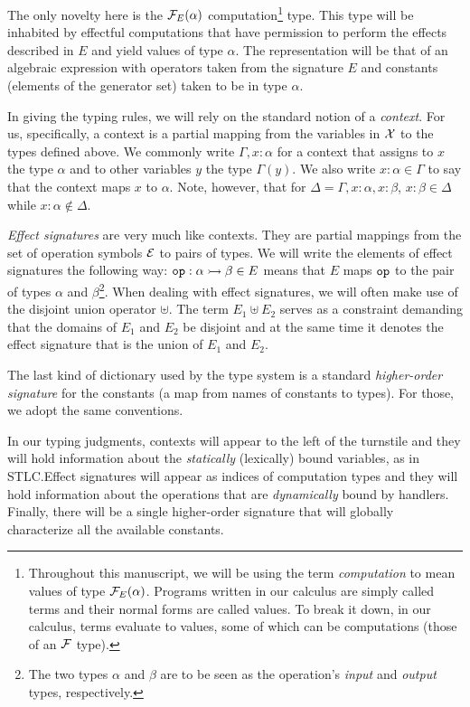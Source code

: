 The only novelty here is the $\mathcal{F}_E(\alpha)$
computation\footnote{Throughout this manuscript, we will be using the term
  \emph{computation} to mean values of type $\mathcal{F}_E(\alpha)$. Programs
  written in our calculus are simply called terms and their normal forms
  are called values. To break it down, in our calculus, terms evaluate to
  values, some of which can be computations (those of an $\mathcal{F}$ type).}
type. This type will be inhabited by effectful computations that have
permission to perform the effects described in $E$ and yield values of type
$\alpha$. The representation will be that of an algebraic expression with
operators taken from the signature $E$ and constants (elements of the
generator set) taken to be in type $\alpha$.

In giving the typing rules, we will rely on the standard notion of a
\emph{context}. For us, specifically, a context is a partial mapping from
the variables in $\mathcal{X}$ to the types defined above.  We commonly write
$\Gamma, x : \alpha$ for a context that assigns to $x$ the type $\alpha$
and to other variables $y$ the type $\Gamma(y)$. We also write $x : \alpha
\in \Gamma$ to say that the context maps $x$ to $\alpha$. Note, however,
that for $\Delta = \Gamma, x : \alpha, x : \beta$, $x : \beta \in \Delta$
while $x : \alpha \notin \Delta$.

\emph{Effect signatures} are very much like contexts. They are partial
mappings from the set of operation symbols $\mathcal{E}$ to pairs of types. We will
write the elements of effect signatures the following way:
$\mathtt{op} : \alpha \rightarrowtail \beta \in E$ means that $E$ maps $\mathtt{op}$ to the
pair of types $\alpha$ and $\beta$\footnote{The two types $\alpha$ and
  $\beta$ are to be seen as the operation's \emph{input} and \emph{output}
  types, respectively.}. When dealing with effect signatures, we will often
make use of the disjoint union operator $\uplus$. The term $E_1 \uplus E_2$
serves as a constraint demanding that the domains of $E_1$ and $E_2$ be
disjoint and at the same time it denotes the effect signature that is the
union of $E_1$ and $E_2$.

The last kind of dictionary used by the type system is a standard
\emph{higher-order signature} for the constants (a map from names of
constants to types). For those, we adopt the same conventions.

In our typing judgments, contexts will appear to the left of the turnstile
and they will hold information about the \emph{statically} (lexically)
bound variables, as in STLC.\@ Effect signatures will appear as indices of
computation types and they will hold information about the operations that
are \emph{dynamically} bound by handlers. Finally, there will be a single
higher-order signature that will globally characterize all the available
constants.

